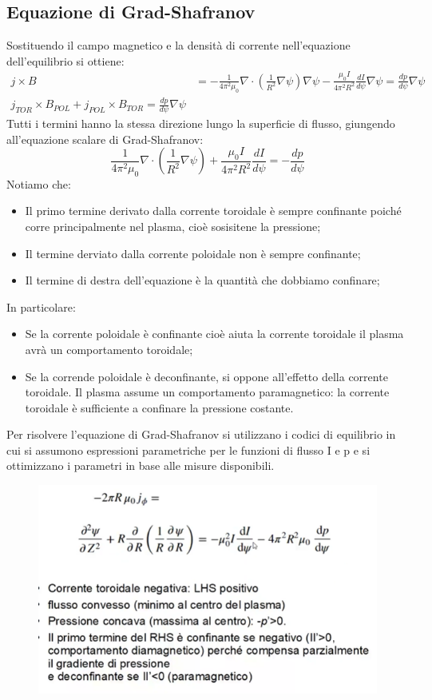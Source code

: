 \documentclass{article}
\begin{document}
\subsection{Equazione di Grad-Shafranov}
Sostituendo il campo magnetico e la densità di corrente nell'equazione dell'equilibrio si ottiene:\begin{align*}
	j\times B & =-\frac{1}{4\pi^{2}\mu_{0}}\nabla\cdot\left(\frac{1}{R^{2}}\nabla\psi\right)\nabla\psi-\frac{\mu_{0}I}{4\pi^{2}R^{2}}\frac{dI}{d\psi}\nabla\psi=\frac{dp}{d\psi}\nabla\psi \\
	j_{TOR}\times B_{POL}+j_{POL}\times B_{TOR}=\frac{dp}{d\psi}\nabla\psi
\end{align*}
Tutti i termini hanno la stessa direzione lungo la superficie di flusso, giungendo all'equazione scalare di Grad-Shafranov:
\textbf{\begin{equation*}
		\frac{1}{4\pi^{2}\mu_{0}}\nabla\cdot\left(\frac{1}{R^{2}}\nabla\psi \right)+\frac{\mu_{0}I}{4\pi^{2}R^{2}}\frac{dI}{d\psi}=-\frac{dp}{d\psi}
	\end{equation*}}
Notiamo che:\begin{itemize}
	\item Il primo termine derivato dalla corrente toroidale è sempre confinante poiché corre principalmente nel plasma, cioè sosisitene la pressione;
	\item Il termine derviato dalla corrente poloidale non è sempre confinante;
	\item Il termine di destra dell'equazione è la quantità che dobbiamo confinare;
\end{itemize}
In particolare:\begin{itemize}
	\item Se la corrente poloidale è confinante cioè aiuta la corrente toroidale il plasma avrà un comportamento toroidale;
	\item Se la corrende poloidale è deconfinante, si oppone all'effetto della corrente toroidale. Il plasma assume un comportamento paramagnetico: la corrente toroidale è sufficiente a confinare la pressione costante.
\end{itemize}
Per risolvere l'equazione di Grad-Shafranov si utilizzano i codici di equilibrio in cui si assumono espressioni parametriche per le funzioni di flusso I e p e si ottimizzano i parametri in base alle misure disponibili.
\begin{figure}
	\centering
	\includegraphics[scale=0.4]{2022-06-26-16-35-40.png}%
\end{figure}
\end{document}
